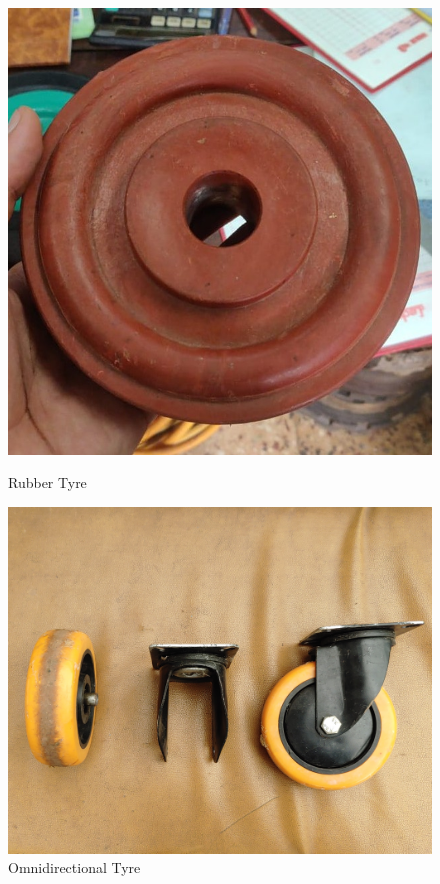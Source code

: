 \begin{figure}[H]
  \centering
    \begin{minipage}{0.40\textwidth}
    \centering
      \includegraphics[width=1\textwidth]{Rubber Tyre.jpg}
      \caption{Rubber Tyre}
      \label{fig:Rubber Tyre}
    \end{minipage}
    \begin{minipage}{0.51\textwidth}
    \centering
      \includegraphics[width=1\textwidth]{Omnidirectional Wheel.jpg}
      \caption{Omnidirectional Tyre}
      \label{fig:Omnidirectional Tyre}
    \end{minipage}
\end{figure}







